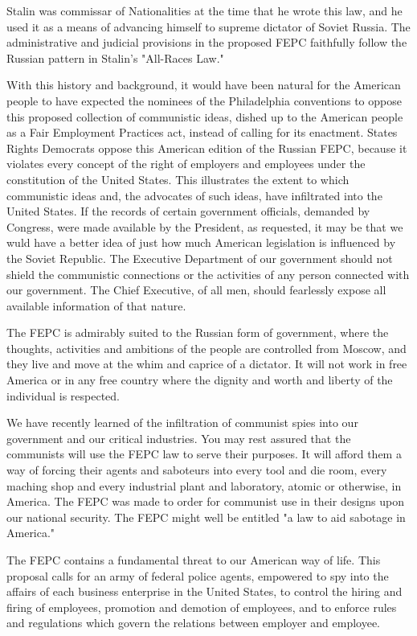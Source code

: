 \documentclass[10pt,a4paper]{article}
\begin{document}
Stalin was commissar of Nationalities at the time that he wrote this law, and he used it as a means of advancing himself to supreme dictator of Soviet Russia. The administrative and judicial provisions in the proposed FEPC faithfully follow the Russian pattern in Stalin's "All-Races Law."

With this history and background, it would have been natural for the American people to have expected the nominees of the Philadelphia conventions to oppose this proposed collection of communistic ideas, dished up to the American people as a Fair Employment Practices act, instead of calling for its enactment. States Rights Democrats oppose this American edition of the Russian FEPC, because it violates every concept of the right of employers and employees under the constitution of the United States. This illustrates the extent to which communistic ideas and, the advocates of such ideas, have infiltrated into the United States. If the records of certain government officials, demanded by Congress, were made available by the President, as requested, it may be that we wuld have a better idea of just how much American legislation is influenced by the Soviet Republic. The Executive Department of our government should not shield the communistic connections or the activities of any person connected with our government. The Chief Executive, of all men, should fearlessly expose all available information of that nature.

The FEPC is admirably suited to the Russian form of government, where the thoughts, activities and ambitions of the people are controlled from Moscow, and they live and move at the whim and caprice of a dictator. It will not work in free America or in any free country where the dignity and worth and liberty of the individual is respected.

We have recently learned of the infiltration of communist spies into our government and our critical industries. You may rest assured that the communists will use the FEPC law to serve their purposes. It will afford them a way of forcing their agents and saboteurs into every tool and die room, every maching shop and every industrial plant and laboratory, atomic or otherwise, in America. The FEPC was made to order for communist use in their designs upon our national security. The FEPC might well be entitled "a law to aid sabotage in America."

The FEPC contains a fundamental threat to our American way of life. This proposal calls for an army of federal police agents, empowered to spy into the affairs of each business enterprise in the United States, to control the hiring and firing of employees, promotion and demotion of employees, and to enforce rules and regulations which govern the relations between employer and employee.
\end{document}

